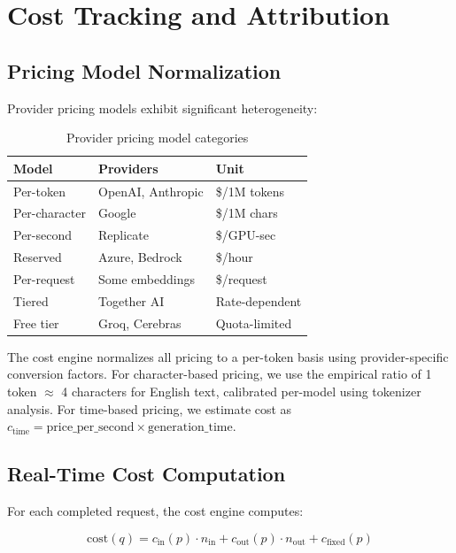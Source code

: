 \section{Cost Tracking and Attribution}

\label{sec:cost}

\subsection{Pricing Model Normalization}

Provider pricing models exhibit significant heterogeneity:

\begin{table}[t]
\centering
\caption{Provider pricing model categories}
\label{tab:pricing}
\begin{tabular}{@{}lll@{}}
\toprule
\textbf{Model} & \textbf{Providers} & \textbf{Unit} \\
\midrule
Per-token & OpenAI, Anthropic & \$/1M tokens \\
Per-character & Google & \$/1M chars \\
Per-second & Replicate & \$/GPU-sec \\
Reserved & Azure, Bedrock & \$/hour \\
Per-request & Some embeddings & \$/request \\
Tiered & Together AI & Rate-dependent \\
Free tier & Groq, Cerebras & Quota-limited \\
\bottomrule
\end{tabular}
\end{table}

The cost engine normalizes all pricing to a per-token basis using provider-specific conversion factors. For character-based pricing, we use the empirical ratio of 1 token $\approx$ 4 characters for English text, calibrated per-model using tokenizer analysis. For time-based pricing, we estimate cost as $c_{\text{time}} = \text{price\_per\_second} \times \text{generation\_time}$.

\subsection{Real-Time Cost Computation}

For each completed request, the cost engine computes:

\begin{equation}
\text{cost}(q) = c_{\text{in}}(p) \cdot n_{\text{in}} + c_{\text{out}}(p) \cdot n_{\text{out}} + c_{\text{fixed}}(p)
\end{equation}

